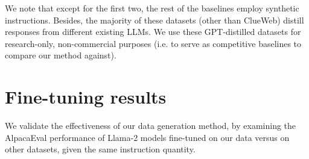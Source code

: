 We note that except for the first two, the rest of the baselines employ synthetic instructions. Besides, the majority of these datasets (other than ClueWeb) distill responses from different existing LLMs. We use these GPT-distilled datasets for research-only, non-commercial purposes (i.e. to serve as competitive baselines to compare our method against).

\vspace{-0.25em}
\section{Fine-tuning results}\label{performance}
We validate the effectiveness of our data generation method, by examining the AlpacaEval performance of Llama-2 models fine-tuned on our data versus on other datasets, given the same instruction quantity.
\vspace{-0.25em}
